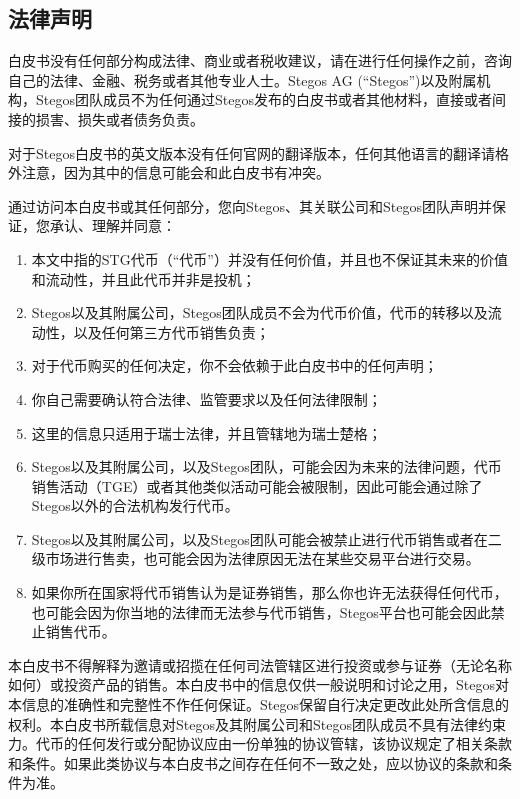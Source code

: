 \documentclass[8pt,fleqn,openany]{book}
\begin{document}
\begin{CJK*}{UTF8}{gbsn}
{\chapter{法律声明}

白皮书没有任何部分构成法律、商业或者税收建议，请在进行任何操作之前，咨询自己的法律、金融、税务或者其他专业人士。Stegos AG (“Stegos”)以及附属机构，Stegos团队成员不为任何通过Stegos发布的白皮书或者其他材料，直接或者间接的损害、损失或者债务负责。

对于Stegos白皮书的英文版本没有任何官网的翻译版本，任何其他语言的翻译请格外注意，因为其中的信息可能会和此白皮书有冲突。

通过访问本白皮书或其任何部分，您向Stegos、其关联公司和Stegos团队声明并保证，您承认、理解并同意：

\begin{enumerate}[label=(\alph*)]
	\item 本文中指的STG代币（“代币”）并没有任何价值，并且也不保证其未来的价值和流动性，并且此代币并非是投机；
	
	\item Stegos以及其附属公司，Stegos团队成员不会为代币价值，代币的转移以及流动性，以及任何第三方代币销售负责；
	
	\item 对于代币购买的任何决定，你不会依赖于此白皮书中的任何声明；
	
	\item 你自己需要确认符合法律、监管要求以及任何法律限制；
	
	\item 这里的信息只适用于瑞士法律，并且管辖地为瑞士楚格；
	
	\item Stegos以及其附属公司，以及Stegos团队，可能会因为未来的法律问题，代币销售活动（TGE）或者其他类似活动可能会被限制，因此可能会通过除了Stegos以外的合法机构发行代币。
	
	\item Stegos以及其附属公司，以及Stegos团队可能会被禁止进行代币销售或者在二级市场进行售卖，也可能会因为法律原因无法在某些交易平台进行交易。

	\item 如果你所在国家将代币销售认为是证券销售，那么你也许无法获得任何代币，也可能会因为你当地的法律而无法参与代币销售，Stegos平台也可能会因此禁止销售代币。
	
\end{enumerate}

本白皮书不得解释为邀请或招揽在任何司法管辖区进行投资或参与证券（无论名称如何）或投资产品的销售。本白皮书中的信息仅供一般说明和讨论之用，Stegos对本信息的准确性和完整性不作任何保证。Stegos保留自行决定更改此处所含信息的权利。本白皮书所载信息对Stegos及其附属公司和Stegos团队成员不具有法律约束力。代币的任何发行或分配协议应由一份单独的协议管辖，该协议规定了相关条款和条件。如果此类协议与本白皮书之间存在任何不一致之处，应以协议的条款和条件为准。

}
\end{CJK*}
\end{document}
